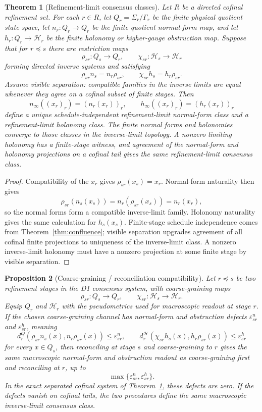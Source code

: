 \documentclass[11pt]{article}
\newtheorem{theorem}{Theorem}[section]
\newtheorem{proposition}[theorem]{Proposition}
\begin{document}
\begin{theorem}[Refinement-limit consensus classes]\label{thm:consensusrefinement}
Let \(R\) be a directed cofinal refinement set. For each \(r\in R\), let
\(Q_r=\Sigma_r/\Gamma_r\) be the finite physical quotient state space, let
\(n_r:Q_r\to Q_r\) be the finite quotient normal-form map, and let
\(h_r:Q_r\to\mathcal H_r\) be the finite holonomy or higher-gauge obstruction map. Suppose that
for \(r\preceq s\) there are restriction maps
\[
\rho_{sr}:Q_s\to Q_r,\qquad \chi_{sr}:\mathcal H_s\to\mathcal H_r
\]
forming directed inverse systems and satisfying
\[
\rho_{sr}n_s=n_r\rho_{sr},
\qquad
\chi_{sr}h_s=h_r\rho_{sr}.
\]
Assume visible separation: compatible families in the inverse limits are equal whenever they
agree on a cofinal subset of finite stages. Then
\[
n_\infty((x_r)_r)=(n_r(x_r))_r,
\qquad
h_\infty((x_r)_r)=(h_r(x_r))_r
\]
define a unique schedule-independent refinement-limit normal-form class and a refinement-limit
holonomy class. The finite normal forms and holonomies converge to those classes in the
inverse-limit topology. A nonzero limiting holonomy has a finite-stage witness, and agreement of
the normal-form and holonomy projections on a cofinal tail gives the same refinement-limit
consensus class.
\end{theorem}

\begin{proof}
Compatibility of the \(x_r\) gives \(\rho_{sr}(x_s)=x_r\). Normal-form naturality then gives
\[
\rho_{sr}(n_s(x_s))=n_r(\rho_{sr}(x_s))=n_r(x_r),
\]
so the normal forms form a compatible inverse-limit family. Holonomy naturality gives the same
calculation for \(h_s(x_s)\). Finite-stage schedule independence comes from
Theorem~\ref{thm:confluence}; visible separation upgrades agreement of all cofinal finite
projections to uniqueness of the inverse-limit class. A nonzero inverse-limit holonomy must have
a nonzero projection at some finite stage by visible separation.
\end{proof}

\begin{proposition}[Coarse-graining / reconciliation compatibility]\label{prop:consensuscoarse}
Let \(r\preceq s\) be two refinement stages in the D1 consensus system, with coarse-graining
maps
\[
\rho_{sr}:Q_s\to Q_r,\qquad \chi_{sr}:\mathcal H_s\to\mathcal H_r.
\]
Equip \(Q_r\) and \(\mathcal H_r\) with the pseudometrics used for macroscopic readout at stage
\(r\). If the chosen coarse-graining channel has normal-form and obstruction defects
\(\varepsilon^n_{sr}\) and \(\varepsilon^h_{sr}\), meaning
\[
d^Q_r(\rho_{sr}n_s(x),n_r\rho_{sr}(x))\le\varepsilon^n_{sr},
\qquad
d^{\mathcal H}_r(\chi_{sr}h_s(x),h_r\rho_{sr}(x))\le\varepsilon^h_{sr}
\]
for every \(x\in Q_s\), then reconciling at stage \(s\) and coarse-graining to \(r\) gives the
same macroscopic normal-form and obstruction readout as coarse-graining first and reconciling at
\(r\), up to
\[
\max\{\varepsilon^n_{sr},\varepsilon^h_{sr}\}.
\]
In the exact separated cofinal system of Theorem~\ref{thm:consensusrefinement}, these defects are
zero. If the defects vanish on cofinal tails, the two procedures define the same macroscopic
inverse-limit consensus class.
\end{proposition}
\end{document}

